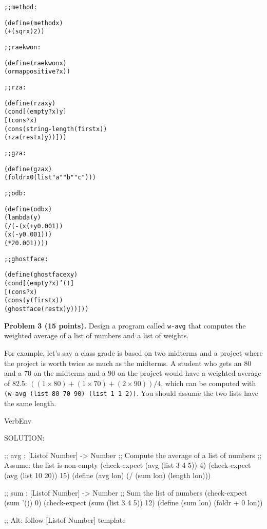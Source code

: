 \documentclass[12pt]{article}
\begin{document}
\begin{alltt}
;; method : 

(define (method x)
  (+ (sqr x) 2))

;; raekwon : 

(define (raekwon x)
  (ormap positive? x))

;; rza : 

(define (rza x y)
  (cond [(empty? x) y]
        [(cons? x)
         (cons (string-length (first x))
               (rza (rest x) y))]))

;; gza : 

(define (gza x)
  (foldr x 0 (list "a" "b" "c")))

;; odb : 

(define (odb x)
  (lambda (y)   
    (/ (- (x (+ y 0.001))
          (x (- y 0.001)))
       (* 2 0.001))))
    

;; ghostface : \censor{[X Y] [Listof X] [X -> Y] -> [Listof Y]}

(define (ghostface x y)
  (cond [(empty? x) '()]
        [(cons? x)
         (cons (y (first x)) 
               (ghostface (rest x) y))]))
\end{alltt}


\newpage

\noindent
{\bf Problem 3 (15 points).}
%
Design a program called {\tt w-avg} that computes the weighted average
of a list of numbers and a list of weights.

For example, let's say a class grade is based on two midterms and a
project where the project is worth twice as much as the midterms.  A
student who gets an 80 and a 70 on the midterms and a 90 on the
project would have a weighted average of 82.5: $((1 \times 80) + (1
\times 70) + (2 \times 90)) / 4$, which can be computed with {\tt
  (w-avg (list 80 70 90) (list 1 1 2))}.  You should assume the two
lists have the same length.


\begin{SaveVerbatim}{VerbEnv}

SOLUTION:

;; avg : [Listof Number] -> Number
;; Compute the average of a list of numbers
;; Assume: the list is non-empty
(check-expect (avg (list 3 4 5)) 4)
(check-expect (avg (list 10 20)) 15)
(define (avg lon)
  (/ (sum lon) 
     (length lon)))

;; sum : [Listof Number] -> Number
;; Sum the list of numbers
(check-expect (sum '()) 0)
(check-expect (sum (list 3 4 5)) 12)
(define (sum lon)
  (foldr + 0 lon))

;; Alt: follow [Listof Number] template
\end{SaveVerbatim}
\end{document}
